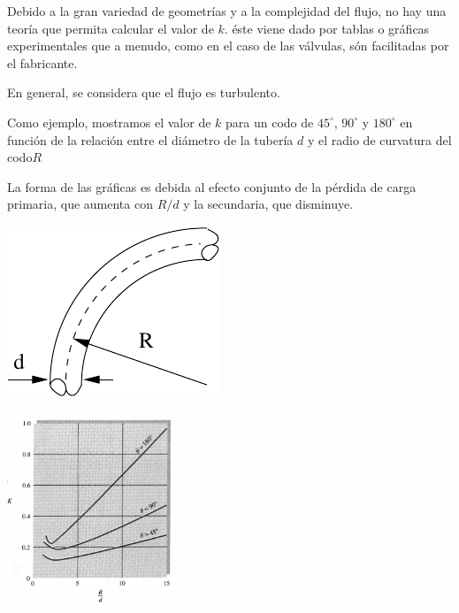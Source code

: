 Debido a la gran variedad de geometr\'ias y a la complejidad del flujo, no hay una teor\'ia que permita calcular el valor de $k$. éste viene dado por tablas o gráficas experimentales que a menudo, como en el caso de las válvulas, són facilitadas por el fabricante.

En general, se considera que el flujo es turbulento.


\begin{minipage}{10cm}
	Como ejemplo, mostramos el valor de $k$ para un codo de $45^\circ$, $90^\circ$ y $180^\circ$ en función de la relación entre el diámetro de la tuber\'ia $d$ y el radio de curvatura del codo$R$ 
	
	La forma de las gráficas es debida al efecto conjunto de la pérdida de carga primaria, que aumenta con $R/d$ y la secundaria, que disminuye.
	\medskip
	\begin{center}
		\includegraphics{TeX_files/chapter10-Tuberias/codo.pdf}
	\end{center}
\end{minipage}
\begin{minipage}{10cm}
	\begin{center}
		\includegraphics[width=5cm]{TeX_files/chapter10-Tuberias/k-codo.png}
	\end{center}
\end{minipage}

